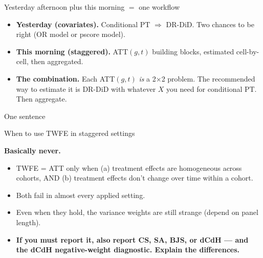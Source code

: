 \documentclass[aspectratio=169,11pt]{beamer}
\begin{document}
\begin{frame}{Yesterday afternoon plus this morning $=$ one workflow}
\vspace{0.5em}
\begin{itemize}
  \item \textbf{Yesterday (covariates).} \;Conditional PT $\Rightarrow$ DR-DiD. \;Two chances to be right (OR model or pscore model).
  \vspace{0.3em}
  \item \textbf{This morning (staggered).} \;ATT$(g,t)$ building blocks, estimated cell-by-cell, then aggregated.
  \vspace{0.3em}
  \item \textbf{The combination.} \;Each ATT$(g,t)$ \textit{is} a 2$\times$2 problem. \;The recommended way to estimate it is DR-DiD with whatever $X$ you need for conditional PT. \;Then aggregate.
\end{itemize}

\vspace{0.7em}
\begin{block}{One sentence}
\centering
{}
\end{block}
\end{frame}

\begin{frame}{When to use TWFE in staggered settings}
\vspace{0.6em}
\begin{center}
\Huge\bfseries\color{harvardcrimson} Basically never.
\end{center}

\vspace{0.6em}
\begin{itemize}\small
  \item TWFE = ATT only when (a) treatment effects are homogeneous across cohorts, AND (b) treatment effects don't change over time within a cohort.
  \item Both fail in almost every applied setting.
  \item Even when they hold, the variance weights are still strange (depend on panel length).
  \item \textbf{If you must report it, also report CS, SA, BJS, or dCdH --- and the dCdH negative-weight diagnostic. Explain the differences.}
\end{itemize}

\vspace{0.5em}
\end{frame}
\end{document}

